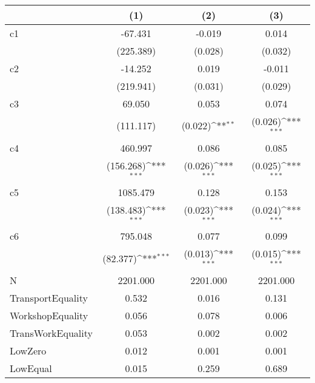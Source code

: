 {
\def\sym#1{\ifmmode^{#1}\else\(^{#1}\)\fi}
\begin{tabular*}{7in}{@{\hskip\tabcolsep\extracolsep\fill}l*{3}{c}}
\hline\hline
                &\multicolumn{1}{c}{(1)}         &\multicolumn{1}{c}{(2)}         &\multicolumn{1}{c}{(3)}         \\
\hline
c1              &  -67.431         &   -0.019         &    0.014         \\
                &(225.389)         &  (0.028)         &  (0.032)         \\
[1em]
c2              &  -14.252         &    0.019         &   -0.011         \\
                &(219.941)         &  (0.031)         &  (0.029)         \\
[1em]
c3              &   69.050         &    0.053         &    0.074         \\
                &(111.117)         &  (0.022)\sym{**} &  (0.026)\sym{***}\\
[1em]
c4              &  460.997         &    0.086         &    0.085         \\
                &(156.268)\sym{***}&  (0.026)\sym{***}&  (0.025)\sym{***}\\
[1em]
c5              & 1085.479         &    0.128         &    0.153         \\
                &(138.483)\sym{***}&  (0.023)\sym{***}&  (0.024)\sym{***}\\
[1em]
c6              &  795.048         &    0.077         &    0.099         \\
                & (82.377)\sym{***}&  (0.013)\sym{***}&  (0.015)\sym{***}\\
\hline
N               & 2201.000         & 2201.000         & 2201.000         \\
TransportEquality&    0.532         &    0.016         &    0.131         \\
WorkshopEquality&    0.056         &    0.078         &    0.006         \\
TransWorkEquality&    0.053         &    0.002         &    0.002         \\
LowZero         &    0.012         &    0.001         &    0.001         \\
LowEqual        &    0.015         &    0.259         &    0.689         \\
\hline\hline
\end{tabular*}
}
